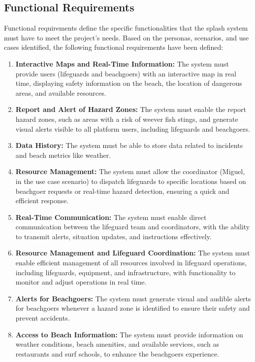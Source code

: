 \subsection{Functional Requirements}
Functional requirements define the specific functionalities that the \ac{splash} system must have to meet the project's needs. Based on the personas, scenarios, and use cases identified, the following functional requirements have been defined:
\begin{enumerate}
    \item \textbf{Interactive Maps and Real-Time Information: } The system must provide users (lifeguards and beachgoers) with an interactive map in real time, displaying safety information on the beach, the location of dangerous areas, and available resources.
    \item \textbf{Report and Alert of Hazard Zones:} The system must enable the report hazard zones, such as areas with a risk of weever fish stings, and generate visual alerts visible to all platform users, including lifeguards and beachgoers.
    \item \textbf{Data History:} The system must be able to store data related to incidents and beach metrics like weather.  
    \item \textbf{Resource Management: } The system must allow the coordinator (Miguel, in the use case scenario) to dispatch lifeguards to specific locations based on beachgoer requests or real-time hazard detection, ensuring a quick and efficient response.
    \item \textbf{Real-Time Communication:} The system must enable direct communication between the lifeguard team and coordinators, with the ability to transmit alerts, situation updates, and instructions effectively.
    \item \textbf{Resource Management and Lifeguard Coordination:} The system must enable efficient management of all resources involved in lifeguard operations, including lifeguards, equipment, and infrastructure, with functionality to monitor and adjust operations in real time.
    \item \textbf{Alerts for Beachgoers:} The system must generate visual and audible alerts for beachgoers whenever a hazard zone is identified to ensure their safety and prevent accidents.
    \item \textbf{Access to Beach Information: } The system must provide information on weather conditions, beach amenities, and available services, such as restaurants and surf schools, to enhance the beachgoers experience.
    
\end{enumerate}

